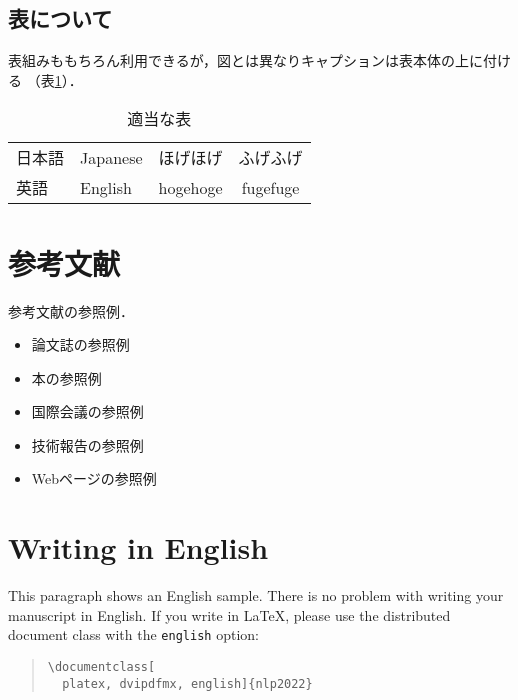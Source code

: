 \documentclass[
  platex, dvipdfmx,  %
]{rbproceedings}
\newcommand{\code}[1]{\texttt{#1}}
\begin{document}
\subsection{表について}

表組みももちろん利用できるが，図とは異なりキャプションは表本体の上に付ける
（表\ref{tab:sample}）．
%
\begin{table}[t]
\centering
\caption{適当な表}
\label{tab:sample}
\begin{tabular}{llcc}
\hline
日本語 & Japanese & ほげほげ & ふげふげ \\
英語 & English & hogehoge & fugefuge \\
\hline
\end{tabular}
\end{table}

\section{参考文献}
参考文献の参照例．
\begin{itemize}
\item 論文誌の参照例 \cite{Article_01}
\item 本の参照例 \cite{Book_02}
\item 国際会議の参照例 \cite{Inproc_03}
\item 技術報告の参照例 \cite{Techrep_05}
\item Webページの参照例 \cite{Web_06}
\end{itemize}

\section{Writing in English}
This paragraph shows an English sample.
There is no problem with writing your manuscript in English.
If you write in LaTeX, please use the distributed document class with the \code{english} option:
\begin{quote}
\verb|\documentclass[|\\
\verb|  platex, dvipdfmx, english]{nlp2022}|
\end{quote}



\end{document}
